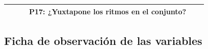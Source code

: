 \documentclass[12pt,a4paper]{article}
\begin{document}
\begin{landscape}
\begin{table}[ht!]
\begin{tabular}{|c|l|l|l|c|c|}
			                                                       &                           &                                    & P17: ¿Yuxtapone los ritmos en el conjunto?                      &  &                                                                                                                                                        \\\hline
		\end{tabular}
	\end{table}
\end{landscape}



\begin{landscape}
\subsection{Ficha de observación de las variables}


\end{landscape}
\end{document}

